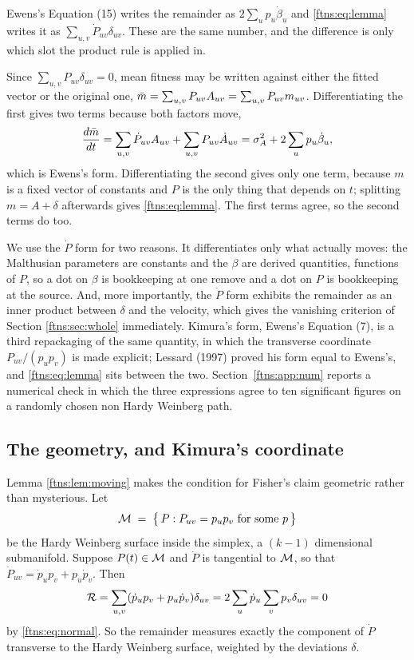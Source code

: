 \begin{remark}
\label{ftns:rem:dot}
Ewens's Equation (15) writes the remainder as $2\sum_up_u\dot\beta_u$ and \eqref{ftns:eq:lemma} writes
it as $\sum_{u,v}\dot P_{uv}\delta_{uv}$. These are the same number, and the difference is only
which slot the product rule is applied in.

Since $\sum_{u,v}P_{uv}\delta_{uv}=0$, mean fitness may be written against either the fitted vector
or the original one, $\bar{m}=\sum_{u,v}P_{uv}A_{uv}=\sum_{u,v}P_{uv}m_{uv}$. Differentiating the
first gives two terms because both factors move,
\[
\frac{d\bar{m}}{dt}=\sum_{u,v}\dot P_{uv}A_{uv}+\sum_{u,v}P_{uv}\dot A_{uv}
=\sigma^{2}_{A}+2\sum_u p_u\dot\beta_u ,
\]
which is Ewens's form. Differentiating the second gives only one term, because $m$ is a fixed
vector of constants and $P$ is the only thing that depends on $t$; splitting $m=A+\delta$
afterwards gives \eqref{ftns:eq:lemma}. The first terms agree, so the second terms do too.

We use the $\dot P$ form for two reasons. It differentiates only what actually moves: the
Malthusian parameters are constants and the $\beta$ are derived quantities, functions of $P$, so a
dot on $\beta$ is bookkeeping at one remove and a dot on $P$ is bookkeeping at the source. And,
more importantly, the $\dot P$ form exhibits the remainder as an inner product between $\delta$
and the velocity, which gives the vanishing criterion of Section \ref{ftns:sec:whole} immediately.
Kimura's form, Ewens's Equation (7), is a third repackaging of the same quantity, in which the transverse
coordinate $P_{uv}/(p_up_v)$ is made explicit; Lessard (1997) proved his form equal to Ewens's, and
\eqref{ftns:eq:lemma} sits between the two. Section~\ref{ftns:app:num} reports a numerical check in which
the three expressions agree to ten significant figures on a randomly chosen non Hardy Weinberg
path.
\end{remark}

\subsection{The geometry, and Kimura's coordinate}

Lemma \ref{ftns:lem:moving} makes the condition for Fisher's claim geometric rather than mysterious.
Let
\[
\mathcal{M} \;=\; \big\{\,P: P_{uv}=p_up_v \ \text{for some } p\,\big\}
\]
be the Hardy Weinberg surface inside the simplex, a $(k-1)$ dimensional submanifold. Suppose
$P(t)\in\mathcal{M}$ and $\dot P$ is tangential to $\mathcal{M}$, so that
$\dot P_{uv}=\dot p_up_v+p_u\dot p_v$. Then
\[
\mathcal{R}=\sum_{u,v}(\dot p_up_v+p_u\dot p_v)\delta_{uv}
=2\sum_u\dot p_u\sum_vp_v\delta_{uv}=0
\]
by \eqref{ftns:eq:normal}. So the remainder measures exactly the component of $\dot P$ transverse to
the Hardy Weinberg surface, weighted by the deviations $\delta$.

